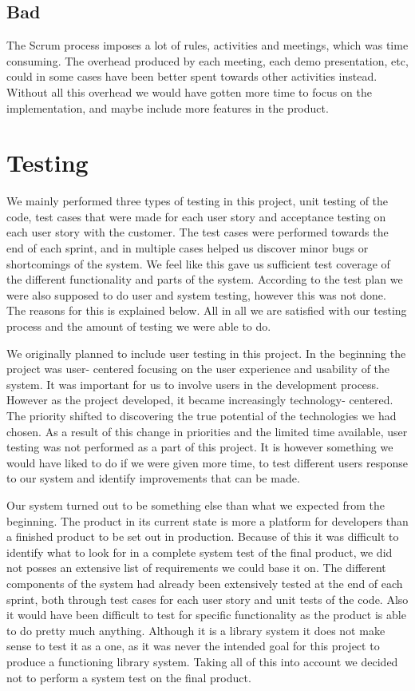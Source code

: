 \subsection*{Bad}
The Scrum process imposes a lot of rules, activities and meetings, which was time consuming. The overhead produced by each meeting, each demo presentation, etc, could in some cases have been better spent towards other activities instead. Without all this overhead we would have gotten more time to focus on the implementation, and maybe include more features in the product.


\section{Testing}
We mainly performed three types of testing in this project, unit testing of the code, test cases that were made for each user story and acceptance testing on each user story with the customer. The test cases were performed towards the end of each sprint, and in multiple cases helped us discover minor bugs or shortcomings of the system. We feel like this gave us sufficient test coverage of the different functionality and parts of the system. According to the test plan we were also supposed to do user and system testing, however this was not done. The reasons for this is explained below. All in all we are satisfied with our testing process and the amount of testing we were able to do.

We originally planned to include user testing in this project. In the beginning the project was user- centered focusing on the user experience and usability of the system. It was important for us to involve users in the development process. However as the project developed, it became increasingly technology- centered. The priority shifted to discovering the true potential of the technologies we had chosen. As a result of this change in priorities and the limited time available, user testing was not performed as a part of this project. It is however something we would have liked to do if we were given more time, to test different users response to our system and identify improvements that can be made.

Our system turned out to be something else than what we expected from the beginning. The product in its current state is more a platform for developers than a finished product to be set out in production. Because of this it was difficult to identify what to look for in a complete system test of the final product, we did not posses an extensive list of requirements we could base it on. The different components of the system had already been extensively tested at the end of each sprint, both through test cases for each user story and unit tests of the code. Also it would have been difficult to test for specific functionality as the product is able to do pretty much anything. Although it is a library system it does not make sense to test it as a one, as it was never the intended goal for this project to produce a functioning library system. Taking all of this into account we decided not to perform a system test on the final product.


